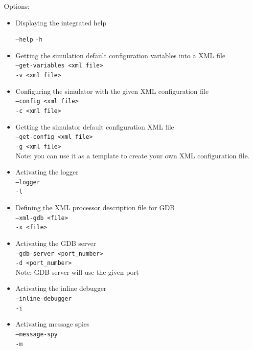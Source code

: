 Options:
\begin{itemize}
\item Displaying the integrated help

\texttt{--help}
\texttt{-h}

\item Getting the simulation default configuration variables into a XML file\\
\texttt{--get-variables <xml file>}\\
\texttt{-v <xml file>}

\item Configuring the simulator with the given XML configuration file\\
\texttt{--config <xml file>}\\
\texttt{-c <xml file>}

\item Getting the simulator default configuration XML file\\
\texttt{--get-config <xml file>}\\
\texttt{-g <xml file>}\\

Note: you can use it as a template to create your own XML configuration file.

\item Activating the logger\\
\texttt{--logger}\\
\texttt{-l}

\item Defining the XML processor description file for GDB\\
\texttt{--xml-gdb <file>}\\
\texttt{-x <file>}

\item Activating the GDB server\\
\texttt{--gdb-server <port\_number>}\\
\texttt{-d <port\_number>}\\
           
Note: GDB server will use the given port\\

\item Activating the inline debugger\\
\texttt{--inline-debugger}\\
\texttt{-i}

\item Activating message spies\\
\texttt{--message-spy}\\
\texttt{-m}
\end{itemize}


